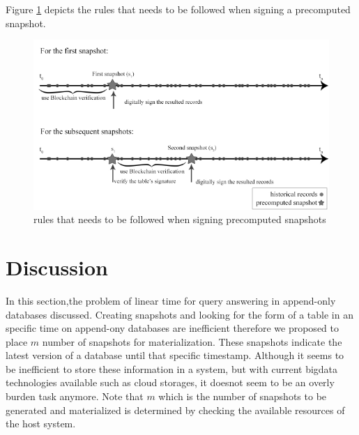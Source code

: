 			Figure \ref{fig:signing_snapshots} depicts the rules that needs to be followed when signing a precomputed snapshot.

			\begin{figure}
				\centering
				\includegraphics[width=\textwidth]{figs/signing_snapshots.pdf}
				\caption{rules that needs to be followed when signing precomputed snapshots}
				\label{fig:signing_snapshots}
			\end{figure}

	\section{Discussion} \label{sec:algorithm_discussion}
		In this section,the problem of linear time for query answering in append-only databases discussed. Creating snapshots and looking for the form of a table in an specific time on append-ony databases are inefficient therefore we proposed to place $m$ number of snapshots for materialization. These snapshots indicate the latest version of a database until that specific timestamp. Although it seems to be inefficient to store these information in a system, but with current bigdata technologies available such as cloud storages, it doesnot seem to be an overly burden task anymore. Note that $m$ which is the number of snapshots to be generated and materialized is determined by checking the available resources of the host system.

